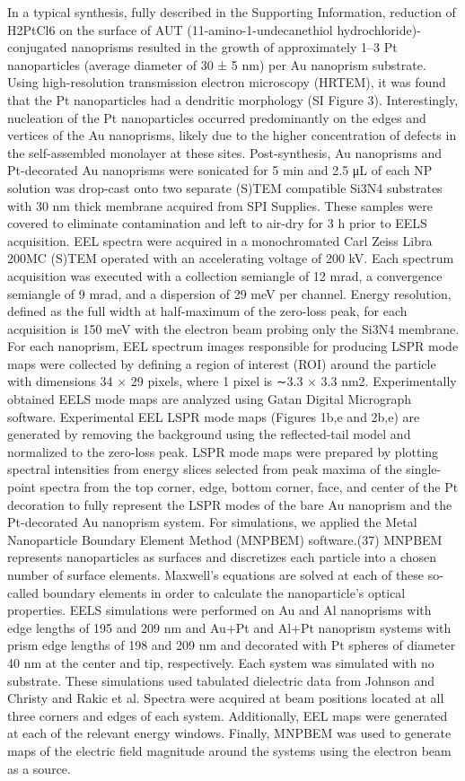 \documentclass [11pt, proquest] {uwthesis}[2016/11/22]
\begin{document}
In a typical synthesis, fully described in the Supporting Information, reduction of H2PtCl6 on the surface of AUT (11-amino-1-undecanethiol hydrochloride)-conjugated nanoprisms resulted in the growth of approximately 1–3 Pt nanoparticles (average diameter of 30 ± 5 nm) per Au nanoprism substrate. Using high-resolution transmission electron microscopy (HRTEM), it was found that the Pt nanoparticles had a dendritic morphology (SI Figure 3). Interestingly, nucleation of the Pt nanoparticles occurred predominantly on the edges and vertices of the Au nanoprisms, likely due to the higher concentration of defects in the self-assembled monolayer at these sites\cite{salvarezza}.
Post-synthesis, Au nanoprisms and Pt-decorated Au nanoprisms were sonicated for 5 min and 2.5 μL of each NP solution was drop-cast onto two separate (S)TEM compatible Si3N4 substrates with 30 nm thick membrane acquired from SPI Supplies. These samples were covered to eliminate contamination and left to air-dry for 3 h prior to EELS acquisition. EEL spectra were acquired in a monochromated Carl Zeiss Libra 200MC (S)TEM operated with an accelerating voltage of 200 kV. Each spectrum acquisition was executed with a collection semiangle of 12 mrad, a convergence semiangle of 9 mrad, and a dispersion of 29 meV per channel. Energy resolution, defined as the full width at half-maximum of the zero-loss peak, for each acquisition is 150 meV with the electron beam probing only the Si3N4 membrane. For each nanoprism, EEL spectrum images responsible for producing LSPR mode maps were collected by defining a region of interest (ROI) around the particle with dimensions 34 × 29 pixels, where 1 pixel is ∼3.3 × 3.3 nm2.
Experimentally obtained EELS mode maps are analyzed using Gatan Digital Micrograph software. Experimental EEL LSPR mode maps (Figures 1b,e and 2b,e) are generated by removing the background using the reflected-tail model and normalized to the zero-loss peak. LSPR mode maps were prepared by plotting spectral intensities from energy slices selected from peak maxima of the single-point spectra from the top corner, edge, bottom corner, face, and center of the Pt decoration to fully represent the LSPR modes of the bare Au nanoprism and the Pt-decorated Au nanoprism system.
For simulations, we applied the Metal Nanoparticle Boundary Element Method (MNPBEM) software.(37) MNPBEM represents nanoparticles as surfaces and discretizes each particle into a chosen number of surface elements. Maxwell’s equations are solved at each of these so-called boundary elements in order to calculate the nanoparticle’s optical properties. EELS simulations were performed on Au and Al nanoprisms with edge lengths of 195 and 209 nm and Au+Pt and Al+Pt nanoprism systems with prism edge lengths of 198 and 209 nm and decorated with Pt spheres of diameter 40 nm at the center and tip, respectively. Each system was simulated with no substrate. These simulations used tabulated dielectric data from Johnson and Christy\cite{JC} and Rakic et al.\cite{Rakic} Spectra were acquired at beam positions located at all three corners and edges of each system. Additionally, EEL maps were generated at each of the relevant energy windows. Finally, MNPBEM was used to generate maps of the electric field magnitude around the systems using the electron beam as a source.
\end{document}
